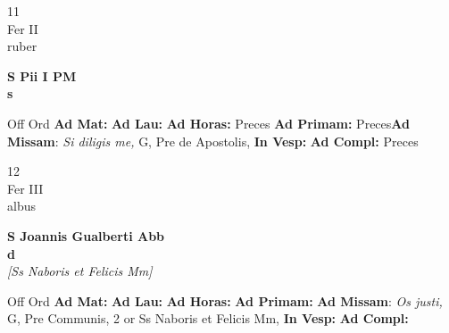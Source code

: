 \documentclass[10pt, openany]{book}
\begin{document}
    \begin{center}
        \begin{minipage}{3.5in}
            \vspace{2em}
            \begin{minipage}{0.5in}
                {\Huge 11} \\
                {\normalsize Fer II} \\
                {\normalsize ruber}
            \end{minipage}
            \begin{minipage}{3.0in}
                \textbf{ \large S Pii I PM \\
                \textnormal{\normalsize s}} \\ 
            \end{minipage}
            \begin{justify}Off Ord
                \textbf{Ad Mat: }
                \textbf{Ad Lau: }
                \textbf{Ad Horas: }Preces
                \textbf{Ad Primam: }Preces\textbf{Ad Missam}: \textit{Si diligis me,} G, Pre de Apostolis,  
                \textbf{In Vesp: }
                \textbf{Ad Compl: }Preces
            \end{justify}
        \end{minipage}
    \end{center}

    \begin{center}
        \begin{minipage}{3.5in}
            \vspace{2em}
            \begin{minipage}{0.5in}
                {\Huge 12} \\
                {\normalsize Fer III} \\
                {\normalsize albus}
            \end{minipage}
            \begin{minipage}{3.0in}
                \textbf{ \large S Joannis Gualberti Abb \\
                \textnormal{\normalsize d}} \\ \textit{[Ss Naboris et Felicis Mm]} \\ 
            \end{minipage}
            \begin{justify}Off Ord
                \textbf{Ad Mat: }
                \textbf{Ad Lau: }
                \textbf{Ad Horas: }
                \textbf{Ad Primam: }\textbf{Ad Missam}: \textit{Os justi,} G, Pre Communis, 2 or Ss Naboris et Felicis Mm,  
                \textbf{In Vesp: }
                \textbf{Ad Compl: }
            \end{justify}
        \end{minipage}
    \end{center}
\end{document}
